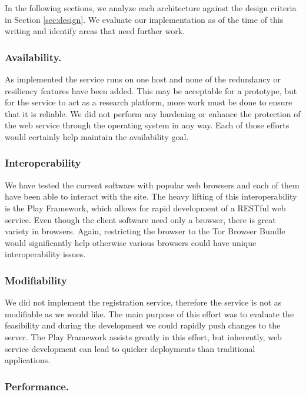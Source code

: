 \documentclass[letterpaper]{article}
\begin{document}
In the following sections, we analyze each architecture against the
design criteria in Section \ref{sec:design}.  We evaluate our
implementation as of the time of this writing and identify areas that
need further work.

\subsubsection{Availability.}

As implemented the service runs on one host and none of the redundancy
or resiliency features have been added.  This may be acceptable for a
prototype, but for the service to act as a research platform, more
work must be done to ensure that it is reliable.  We did not perform
any hardening or enhance the protection of the web service through the
operating system in any way.  Each of those efforts would certainly
help maintain the availability goal.

\subsubsection{Interoperability}

We have tested the current software with popular web browsers and each
of them have been able to interact with the site.  The heavy lifting
of this interoperability is the Play Framework, which allows for rapid
development of a RESTful web service.  Even though the client software
need only a browser, there is great variety in browsers.  Again,
restricting the browser to the Tor Browser Bundle would significantly
help otherwise various browsers could have unique interoperability issues.

\subsubsection{Modifiability}

We did not implement the registration service, therefore the service
is not as modifiable as we would like.  The main purpose of this
effort was to evaluate the feasibility and during the development we
could rapidly push changes to the server.  The Play Framework assists
greatly in this effort, but inherently, web service development can
lead to quicker deployments than traditional applications.


\subsubsection{Performance.}
\end{document}
